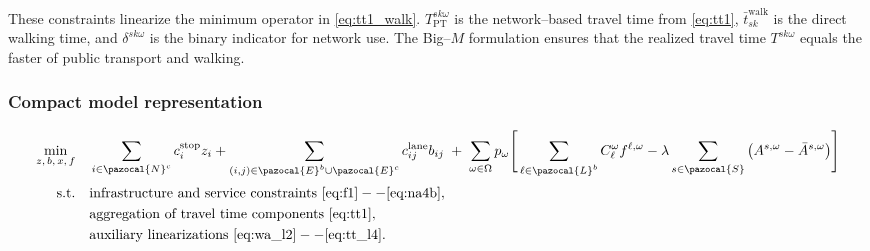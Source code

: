 \documentclass[3p,times,procedia]{elsarticle}
\begin{document}
These constraints linearize the minimum operator in \eqref{eq:tt1_walk}.  
$T_{\text{PT}}^{sk\omega}$ is the network–based travel time from \eqref{eq:tt1}, $\bar{t}_{sk}^{\text{walk}}$ is the direct walking time, and $\delta^{sk\omega}$ is the binary indicator for network use.  
The Big–$M$ formulation ensures that the realized travel time $T^{sk\omega}$ equals the faster of public transport and walking.

\subsubsection{Compact model representation}\label{sec:model}
\begin{align}
\min_{z,\,b,\,x,\,f}\quad 
& \sum_{i \in \pazocal{N}^c} c_i^{\text{stop}} z_i
  + \sum_{(i,j) \in \pazocal{E}^b \cup \pazocal{E}^c} c_{ij}^{\text{lane}} b_{ij}
\;+\;
\sum_{\omega \in \Omega} p_\omega \Bigg[
    \sum_{\ell \in \pazocal{L}^b} C_{\ell}^{\omega} f^{\ell,\omega}
    - \lambda \sum_{s \in \pazocal{S}} \big(A^{s,\omega} - \bar{A}^{s,\omega}\big)
\Bigg]
\label{eq:obj_compact_final}
\\[2pt]
\text{s.t.}\quad
& \text{infrastructure and service constraints } \eqref{eq:f1}--\eqref{eq:na4b}, \notag\\
& \text{aggregation of travel time components } \eqref{eq:tt1}, \notag\\
& \text{auxiliary linearizations } \eqref{eq:wa_l2}--\eqref{eq:tt_l4}. \notag
\end{align}





\end{document}
